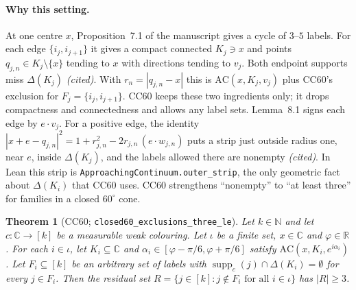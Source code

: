 \documentclass[11pt]{article}
\newtheorem{theorem}{Theorem}[section]
\theoremstyle{definition}
\theoremstyle{remark}
\begin{document}
\paragraph{Why this setting.} At one centre $x$, Proposition~7.1 of the
manuscript gives a cycle of $3$--$5$ labels. For each edge
$\{i_j,i_{j+1}\}$ it gives a compact connected $K_j\ni x$ and points
$q_{j,n}\in K_j\setminus\{x\}$ tending to $x$ with directions tending to
$v_j$. Both endpoint supports miss $\Delta(K_j)$ \emph{(cited)}. With
$r_n=|q_{j,n}-x|$ this is $\mathrm{AC}(x,K_j,v_j)$ plus CC60's exclusion for
$F_j=\{i_j,i_{j+1}\}$. CC60 keeps these two ingredients only; it drops
compactness and connectedness and allows any label sets.
Lemma~8.1 signs each edge by $e\cdot v_j$. For a positive edge, the identity
$|x+e-q_{j,n}|^2=1+r_{j,n}^2-2r_{j,n}\,(e\cdot w_{j,n})$ puts a strip just
outside radius one, near $e$, inside $\Delta(K_j)$, and the labels allowed
there are nonempty \emph{(cited)}. In Lean this strip is
\texttt{Approaching\allowbreak{}Continuum.\allowbreak{}outer\_\allowbreak{}strip}, the only geometric fact about
$\Delta(K_i)$ that CC60 uses. CC60 strengthens ``nonempty'' to ``at least
three'' for families in a closed $60^\circ$ cone.

\begin{theorem}[CC60; \texttt{closed60\_\allowbreak{}exclusions\_\allowbreak{}three\_\allowbreak{}le}]\label{thm:cc60}
Let $k\in\mathbb N$ and let $c:\mathbb C\to[k]$ be a measurable weak
colouring. Let $\iota$ be a finite set, $x\in\mathbb C$ and
$\varphi\in\mathbb R$. For each $i\in\iota$, let $K_i\subseteq\mathbb C$ and
$\alpha_i\in[\varphi-\pi/6,\varphi+\pi/6]$ satisfy
$\mathrm{AC}(x,K_i,e^{i\alpha_i})$. Let $F_i\subseteq[k]$ be an arbitrary set
of labels with $\operatorname{supp}_c(j)\cap\Delta(K_i)=\emptyset$ for every
$j\in F_i$. Then the residual set
$R=\{j\in[k]: j\notin F_i\text{ for all }i\in\iota\}$ has $|R|\ge3$.
\end{theorem}
\end{document}
